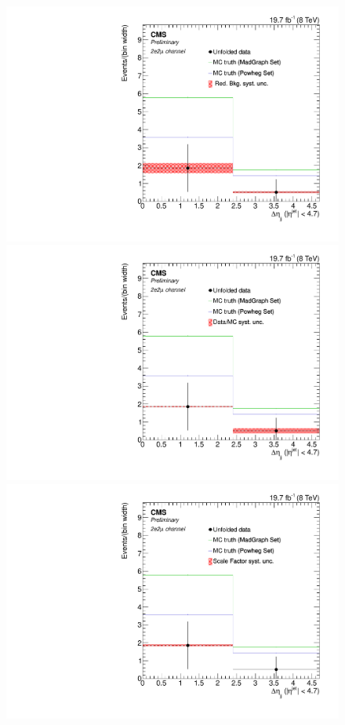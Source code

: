 \begin{figure}[hbtp]
\begin{center}
   \includegraphics[width=0.8\cmsFigWidth]{Figures/Unfolding/Systematics/ZZTo2e2m_Deta_RedBkg_Mad_fr}     
   \includegraphics[width=0.8\cmsFigWidth]{Figures/Unfolding/Systematics/ZZTo2e2m_Deta_UnfDataOverGenMC_Mad_fr}     
   \includegraphics[width=0.8\cmsFigWidth]{Figures/Unfolding/Systematics/ZZTo2e2m_Deta_SFSq_Mad_fr}

\end{center}
\end{figure}
